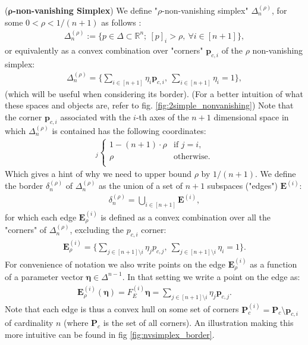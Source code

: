 \begin{definition}
    \label{def:rho_non_vanishing_simplex}
    (\textbf{$\bm{\rho}$-non-vanishing Simplex}) We define "$\rho$-non-vanishing simplex" $\Delta^{(\rho)}_n$, for some $0 < \rho < 1/(n+1)$ as follows : 
    \begin{align*}
        \Delta^{(\rho)}_n := \Big\{ p \in \Delta \subset \mathbb{R}^n;~ [p]_i > \rho, ~ \forall i \in [n+1] \Big\},
    \end{align*}
    or equivalently as a convex combination over "corners" $\bm{p}_{c,i}$ of the $\rho$ non-vanishing simplex:
    \begin{align*}
        \Delta^{(\rho)}_n = \Big\{ \sum_{i\in [n+1]} \eta_i \bm{p}_{c,i},~ \sum_{i \in [n+1]} \eta_i = 1 \},
    \end{align*}
    (which will be useful when considering its border). (For a better intuition of what these spaces and objects are, refer to fig. \ref{fig:2simple_nonvanishing}) Note that the corner $\bm{p}_{c,i}$ associated with the $i$-th axes of the $n+1$ dimensional space in which $\Delta^{(\rho)}_n$ is contained has the following coordinates:
    \begin{align*}
        [\bm{p}_{c,i}]_j \begin{cases}
            1-(n+1)\cdot \rho & \text{if } j=i,\\
            \rho & \text{otherwise.}\\
        \end{cases}
    \end{align*}
    Which gives a hint of why we need to upper bound $\rho$ by $1/(n+1)$. We define the border $\delta_n^{(\rho)}$ of $\Delta^{(\rho)}_n$ as the union of a set of $n+1$ subspaces ("edges") $\bm{E}^{(i)}$:
    \begin{align*}
        \delta_n^{(\rho)} = \bigcup_{i\in [n+1]} \bm{E}^{(i)},
    \end{align*}
    for which each edge $\bm{E}^{(i)}_\rho$ is defined as a convex combination over all the "corners" of $\Delta^{(\rho)}_n$, excluding the $p_{c,i}$ corner:
    \begin{align*}
        \bm{E}^{(i)}_\rho = \Big\{ \sum_{j \in [n+1]\setminus i} \eta_j p_{c,j},~ \sum_{j \in [n+1]\setminus i} \eta_i = 1 \}.
    \end{align*}
    For convenience of notation we also write points on the edge $\bm{E}^{(i)}_\rho$ as a function of a parameter vector $\bm{\eta} \in \Delta^{n-1}$. In that setting we write a point on the edge as: 
    \begin{align*}
        \bm{E}^{(i)}_\rho(\bm{\eta}) = F^{(i)}_E \bm{\eta} = \sum_{j \in [n+1] \setminus i} \eta_j \bm{p}_{c,j}.
    \end{align*}
    Note that each edge is thus a convex hull on some set of corners $\bm{P}_c^{(i)} = \bm{P}_c \setminus \bm{p}_{c,i}$ of cardinality $n$ (where $\bm{P}_c$ is the set of all corners). An illustration making this more intuitive can be found in fig \ref{fig:nvsimplex_border}.
\end{definition}

